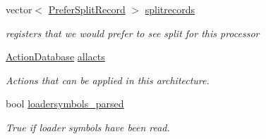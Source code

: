 \begin{DoxyCompactItemize}
vector$<$ \mbox{\hyperlink{struct_prefer_split_record}{Prefer\+Split\+Record}} $>$ \mbox{\hyperlink{class_architecture_a2ed25d7790e67e8bfaef34c092e5f39b}{splitrecords}}
\begin{DoxyCompactList}\small\item\em registers that we would prefer to see split for this processor \end{DoxyCompactList}\item 
\mbox{\hyperlink{class_action_database}{Action\+Database}} \mbox{\hyperlink{class_architecture_a4cbe1c5d170cb2a4d359765b97fef26f}{allacts}}
\begin{DoxyCompactList}\small\item\em Actions that can be applied in this architecture. \end{DoxyCompactList}\item 
bool \mbox{\hyperlink{class_architecture_aff44e0cd6303a22689d6601fc5418918}{loadersymbols\+\_\+parsed}}
\begin{DoxyCompactList}\small\item\em True if loader symbols have been read. \end{DoxyCompactList}\end{DoxyCompactItemize}
